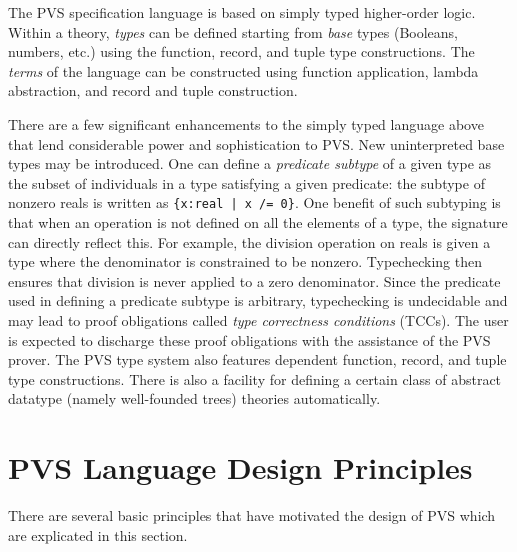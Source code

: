 The PVS specification language is based on simply typed higher-order
logic.  Within a theory, \emph{types} can be defined starting from
\emph{base} types (Booleans, numbers, etc.) using the function, record,
and tuple type constructions.  The \emph{terms} of the language can be
constructed using function application, lambda abstraction, and record and
tuple construction.

There are a few significant enhancements to the simply typed language
above that lend considerable power and sophistication to PVS.  New
uninterpreted base types may be introduced.  One can define a
\emph{predicate subtype} of a given type as the subset of individuals in a
type satisfying a given predicate: the subtype of nonzero reals is
written as \texttt{\{x:real | x /= 0\}}.  One benefit of such
subtyping is that when an operation is not defined on all the elements of
a type, the signature can directly reflect this.  For example, the
division operation on reals is given a type where the denominator is
constrained to be nonzero.  Typechecking then ensures that
division is never applied to a zero denominator.  Since the predicate used
in defining a predicate subtype is arbitrary, typechecking is undecidable
and may lead to proof obligations called \emph{type correctness
conditions} (TCCs).  The user is expected to discharge these proof
obligations with the assistance of the PVS prover.  The PVS type system
also features dependent function, record, and tuple type constructions.
There is also a facility for defining a certain class of abstract datatype
(namely well-founded trees) theories automatically.

\section{PVS Language Design Principles}

There are several basic principles that have motivated the design of
PVS which are explicated in this section.

